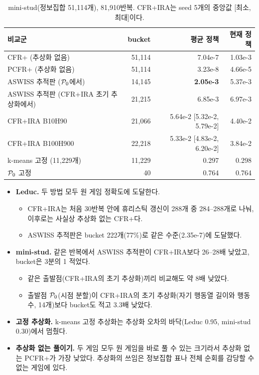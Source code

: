 \begin{table}[h]
\centering\small
\caption{mini-stud(정보집합 51,114개), 81,910반복. CFR+IRA는 seed 5개의 중앙값 [최소, 최대]이다.}\label{tab:small}
\begin{tabular}{@{}lrrr@{}}
\toprule
비교군 & bucket & 평균 정책 & 현재 정책 \\
\midrule
CFR+ (추상화 없음) & 51,114 & 7.04e-7 & 1.03e-3 \\
PCFR+ (추상화 없음) & 51,114 & 3.23e-8 & 4.66e-5 \\
ASWISS 추적판 ($\mathcal{P}_0$에서) & 14,145 & \textbf{2.05e-3} & 5.37e-3 \\
ASWISS 추적판 (CFR+IRA 초기 추상화에서) & 21,215 & 6.85e-3 & 6.97e-3 \\
CFR+IRA B10H90 & 21,066 & 5.64e-2 [5.32e-2, 5.79e-2] & 4.40e-2 \\
CFR+IRA B100H900 & 22,218 & 5.33e-2 [4.83e-2, 6.20e-2] & 3.84e-2 \\
k-means 고정 (11,229개) & 11,229 & 0.297 & 0.298 \\
$\mathcal{P}_0$ 고정 & 40 & 0.764 & 0.764 \\
\bottomrule
\end{tabular}
\end{table}

\begin{itemize}
  \item \textbf{Leduc.} 두 방법 모두 원 게임 정확도에 도달한다.
    \begin{itemize}
      \item CFR+IRA는 처음 30반복 안에 휴리스틱 갱신이 288개 중 284–288개로 나눠, 이후로는 사실상 추상화 없는 CFR+다.
      \item ASWISS 추적판은 bucket 222개(77\%)로 같은 수준(2.35e-7)에 도달했다.
    \end{itemize}
  \item \textbf{mini-stud.} 같은 반복에서 ASWISS 추적판이 CFR+IRA보다 26–28배 낮았고, bucket은 3분의 1 적었다.
    \begin{itemize}
      \item 같은 출발점(CFR+IRA의 초기 추상화)끼리 비교해도 약 8배 낮았다.
      \item 출발점 $\mathcal{P}_0$(시점 분할)이 CFR+IRA의 초기 추상화(자기 행동열 길이와 행동 수, 14개)보다 bucket도 적고 3.3배 낮았다.
    \end{itemize}
  \item \textbf{고정 추상화.} k-means 고정 추상화는 추상화 오차의 바닥(Leduc 0.95, mini-stud 0.30)에서 멈췄다.
  \item \textbf{추상화 없는 풀이기.} 두 게임 모두 원 게임을 바로 풀 수 있는 크기라서 추상화 없는 PCFR+가 가장 낮았다. 추상화의 쓰임은 정보집합 표나 전체 순회를 감당할 수 없는 게임에 있다.
\end{itemize}

